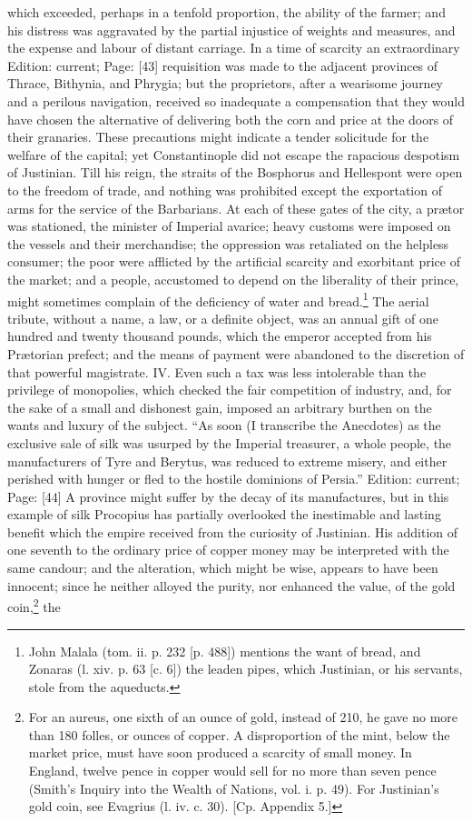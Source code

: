 which exceeded, perhaps in a tenfold proportion, the ability of the farmer; and his distress was aggravated by the partial injustice of weights and measures, and the expense and labour of distant carriage. In a time of scarcity an extraordinary Edition: current; Page: [43] requisition was made to the adjacent provinces of Thrace, Bithynia, and Phrygia; but the proprietors, after a wearisome journey and a perilous navigation, received so inadequate a compensation that they would have chosen the alternative of delivering both the corn and price at the doors of their granaries. These precautions might indicate a tender solicitude for the welfare of the capital; yet Constantinople did not escape the rapacious despotism of Justinian. Till his reign, the straits of the Bosphorus and Hellespont were open to the freedom of trade, and nothing was prohibited except the exportation of arms for the service of the Barbarians. At each of these gates of the city, a prætor was stationed, the minister of Imperial avarice; heavy customs were imposed on the vessels and their merchandise; the oppression was retaliated on the helpless consumer; the poor were afflicted by the artificial scarcity and exorbitant price of the market; and a people, accustomed to depend on the liberality of their prince, might sometimes complain of the deficiency of water and bread.\footnote{John Malala (tom. ii. p. 232 [p. 488]) mentions the want of bread, and Zonaras (l. xiv. p. 63 [c. 6]) the leaden pipes, which Justinian, or his servants, stole from the aqueducts.} The aerial tribute, without a name, a law, or a definite object, was an annual gift of one hundred and twenty thousand pounds, which the emperor accepted from his Prætorian prefect; and the means of payment were abandoned to the discretion of that powerful magistrate. IV. Even such a tax was less intolerable than the privilege of monopolies, which checked the fair competition of industry, and, for the sake of a small and dishonest gain, imposed an arbitrary burthen on the wants and luxury of the subject. \texthebrew{“}As soon (I transcribe the Anecdotes) as the exclusive sale of silk was usurped by the Imperial treasurer, a whole people, the manufacturers of Tyre and Berytus, was reduced to extreme misery, and either perished with hunger or fled to the hostile dominions of Persia.\texthebrew{}” Edition: current; Page: [44] A province might suffer by the decay of its manufactures, but in this example of silk Procopius has partially overlooked the inestimable and lasting benefit which the empire received from the curiosity of Justinian. His addition of one seventh to the ordinary price of copper money may be interpreted with the same candour; and the alteration, which might be wise, appears to have been innocent; since he neither alloyed the purity, nor enhanced the value, of the gold coin,\footnote{For an aureus, one sixth of an ounce of gold, instead of 210, he gave no more than 180 folles, or ounces of copper. A disproportion of the mint, below the market price, must have soon produced a scarcity of small money. In England, twelve pence in copper would sell for no more than seven pence (Smith\texthebrew{}’s Inquiry into the Wealth of Nations, vol. i. p. 49). For Justinian\texthebrew{}’s gold coin, see Evagrius (l. iv. c. 30). [Cp. Appendix 5.]} the 